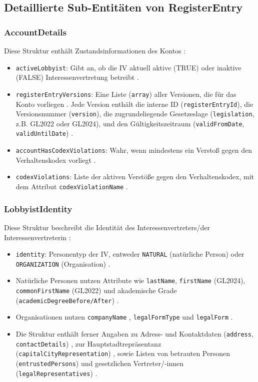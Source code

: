 \documentclass[12pt,twoside=false,a4paper,parskip]{scrbook}
\begin{document}
\subsection{Detaillierte Sub-Entitäten von RegisterEntry}

\subsubsection{AccountDetails}
Diese Struktur enthält Zustandsinformationen des Kontos :
\begin{itemize}
\item \texttt{activeLobbyist}: Gibt an, ob die IV aktuell aktive (TRUE) oder inaktive (FALSE) Interessenvertretung betreibt .
\item \texttt{registerEntryVersions}: Eine Liste (\texttt{array}) aller Versionen, die für das Konto vorliegen . Jede Version enthält die interne ID (\texttt{registerEntryId}), die Versionsnummer (\texttt{version}), die zugrundeliegende Gesetzeslage (\texttt{legislation}, z.B. GL2022 oder GL2024), und den Gültigkeitszeitraum (\texttt{validFromDate}, \texttt{validUntilDate}) .
\item \texttt{accountHasCodexViolations}: Wahr, wenn mindestens ein Verstoß gegen den Verhaltenskodex vorliegt .
\item \texttt{codexViolations}: Liste der aktiven Verstöße gegen den Verhaltenskodex, mit dem Attribut \texttt{codexViolationName} .
\end{itemize}

\subsubsection{LobbyistIdentity}
Diese Struktur beschreibt die Identität des Interessenvertreters/der Interessenvertreterin :
\begin{itemize}
\item \texttt{identity}: Personentyp der IV, entweder \texttt{NATURAL} (natürliche Person) oder \texttt{ORGANIZATION} (Organisation) .
\item Natürliche Personen nutzen Attribute wie \texttt{lastName}, \texttt{firstName} (GL2024), \texttt{commonFirstName} (GL2022) und akademische Grade (\texttt{academicDegreeBefore/After}) .
\item Organisationen nutzen \texttt{companyName} , \texttt{legalFormType} und \texttt{legalForm} .
\item Die Struktur enthält ferner Angaben zu Adress- und Kontaktdaten (\texttt{address}, \texttt{contactDetails}) , zur Hauptstadtrepräsentanz (\texttt{capitalCityRepresentation}) , sowie Listen von betrauten Personen (\texttt{entrustedPersons})  und gesetzlichen Vertreter/-innen (\texttt{legalRepresentatives}) .
\end{itemize}
\end{document}
